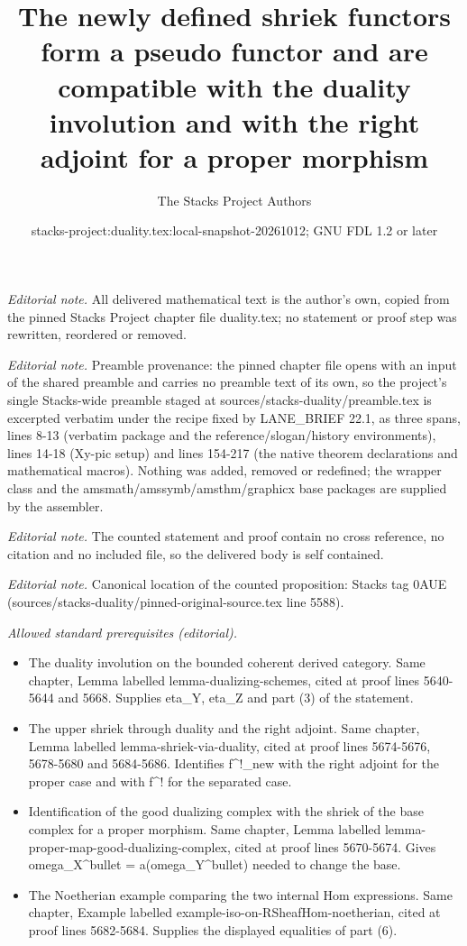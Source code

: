 \documentclass[10pt,a4paper]{amsart}
\title{The newly defined shriek functors form a pseudo functor and are compatible with the duality involution and with the right adjoint for a proper morphism}
\author{The Stacks Project Authors}
\date{stacks-project:duality.tex:local-snapshot-20261012; GNU FDL 1.2 or later}
\theoremstyle{plain}
\theoremstyle{definition}
\theoremstyle{remark}
\numberwithin{equation}{subsection}
\begin{document}
\maketitle
\noindent\textit{Editorial note.} All delivered mathematical text is the author's own, copied from the pinned Stacks Project chapter file duality.tex; no statement or proof step was rewritten, reordered or removed.\par\medskip
\noindent\textit{Editorial note.} Preamble provenance: the pinned chapter file opens with an input of the shared preamble and carries no preamble text of its own, so the project's single Stacks-wide preamble staged at sources/stacks-duality/preamble.tex is excerpted verbatim under the recipe fixed by LANE\_BRIEF 22.1, as three spans, lines 8-13 (verbatim package and the reference/slogan/history environments), lines 14-18 (Xy-pic setup) and lines 154-217 (the native theorem declarations and mathematical macros). Nothing was added, removed or redefined; the wrapper class and the amsmath/amssymb/amsthm/graphicx base packages are supplied by the assembler.\par\medskip
\noindent\textit{Editorial note.} The counted statement and proof contain no cross reference, no citation and no included file, so the delivered body is self contained.\par\medskip
\noindent\textit{Editorial note.} Canonical location of the counted proposition: Stacks tag 0AUE (sources/stacks-duality/pinned-original-source.tex line 5588).\par\medskip
\noindent\textit{Allowed standard prerequisites (editorial).}\begin{itemize}
\item The duality involution on the bounded coherent derived category. Same chapter, Lemma labelled lemma-dualizing-schemes, cited at proof lines 5640-5644 and 5668. Supplies eta\_Y, eta\_Z and part (3) of the statement.
\item The upper shriek through duality and the right adjoint. Same chapter, Lemma labelled lemma-shriek-via-duality, cited at proof lines 5674-5676, 5678-5680 and 5684-5686. Identifies f\textasciicircum{}!\_new with the right adjoint for the proper case and with f\textasciicircum{}! for the separated case.
\item Identification of the good dualizing complex with the shriek of the base complex for a proper morphism. Same chapter, Lemma labelled lemma-proper-map-good-dualizing-complex, cited at proof lines 5670-5674. Gives omega\_X\textasciicircum{}bullet = a(omega\_Y\textasciicircum{}bullet) needed to change the base.
\item The Noetherian example comparing the two internal Hom expressions. Same chapter, Example labelled example-iso-on-RSheafHom-noetherian, cited at proof lines 5682-5684. Supplies the displayed equalities of part (6).
\end{itemize}\medskip
\end{document}
